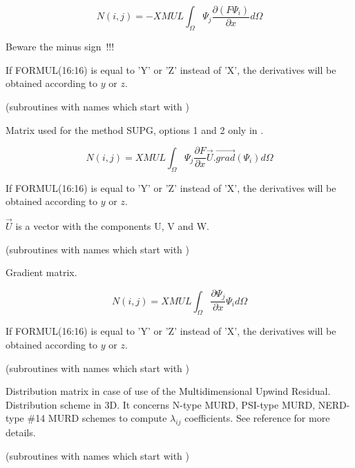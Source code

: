 \[N(i,j)=-XMUL \int _{\Omega }\Psi _{j} \frac{\partial (F \Psi _{i} )}{\partial x} d\Omega  \]

Beware the minus sign~!!!

If FORMUL(16:16) is equal to 'Y' or 'Z' instead of 'X', the derivatives will be
obtained according to $y$ or $z$.


(subroutines with names which start with )

Matrix used for the method SUPG, options 1 and 2 only in .

\[N(i,j)=XMUL \int _{\Omega }
\Psi _{j} \frac{\partial F}{\partial x}
\vec{U} . \overrightarrow{grad} (\Psi _{i} )d\Omega \]

If FORMUL(16:16) is equal to 'Y' or 'Z' instead of 'X', the derivatives will be
obtained according to $y$ or $z$.

$\vec{U}$ is a vector with the components U, V and W.


(subroutines with names which start with )


Gradient matrix.

\[N(i,j)=XMUL \int _{\Omega } \frac{\partial \Psi _{j} }{\partial x} \Psi _{i} d\Omega  \]

If FORMUL(16:16) is equal to 'Y' or 'Z' instead of 'X', the derivatives will be
obtained according to $y$ or $z$.


(subroutines with names which start with )

Distribution matrix in case of use of the Multidimensional Upwind Residual.
Distribution scheme in 3D.
It concerns N-type MURD, PSI-type MURD, NERD-type \#14 MURD schemes
to compute $\lambda_{ij}$ coefficients.
See reference \cite{Janin1996} for more details.



(subroutines with names which start with )

